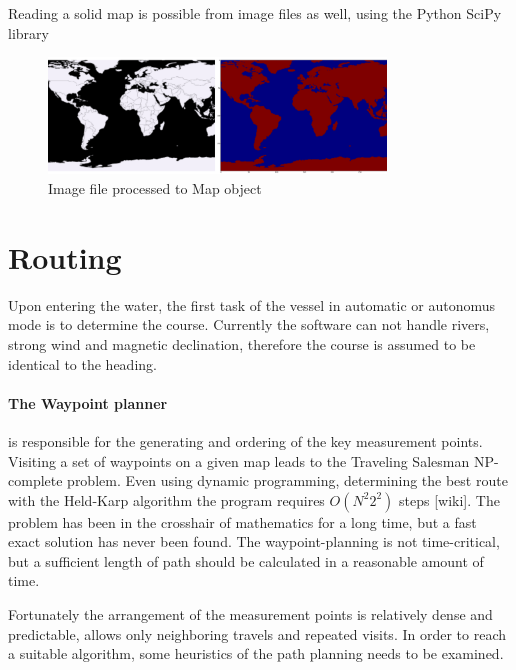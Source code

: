 Reading a solid map is possible from image files as well, using the Python SciPy library

\begin{figure}[H]
	\centering
	\includegraphics[width=0.8\textwidth]{img/worldmap}
	\caption{Image file processed to Map object}
	\label{fig:worldmap}
\end{figure}

\section{Routing}

Upon entering the water, the first task of the vessel in automatic or autonomus mode is to determine the course. Currently the software can not handle rivers, strong wind and magnetic declination, therefore the course is assumed to be identical to the heading.

\paragraph{The Waypoint planner} is responsible for the generating and ordering of the key measurement points. Visiting a set of waypoints on a given map leads to the Traveling Salesman NP-complete problem. Even using dynamic programming, determining the best route with the Held-Karp algorithm the program requires $O(N^2 2^2)$ steps [wiki]. The problem has been in the crosshair of mathematics for a long time, but a fast exact solution has never been found. The waypoint-planning is not time-critical, but a sufficient length of path should be calculated in a reasonable amount of time.

Fortunately the arrangement of the measurement points is relatively dense and predictable, allows only neighboring travels and repeated visits. In order to reach a suitable algorithm, some heuristics of the path planning needs to be examined.

